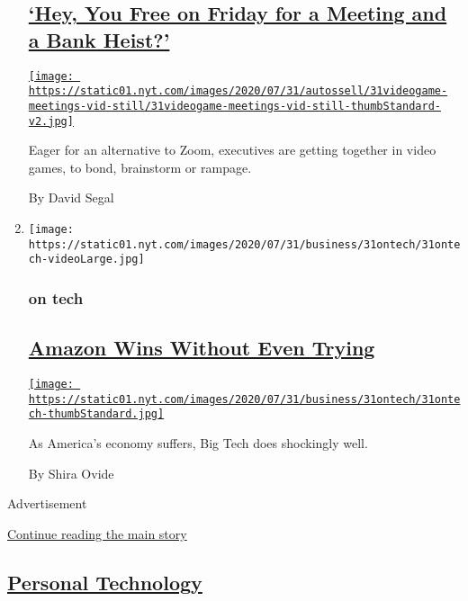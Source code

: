 \begin{enumerate}
{  \subsection{\texorpdfstring{\href{/2020/07/31/business/video-game-meetings.html}{`Hey,
  You Free on Friday for a Meeting and a Bank
  Heist?'}}{`Hey, You Free on Friday for a Meeting and a Bank Heist?'}}\label{hey-you-free-on-friday-for-a-meeting-and-a-bank-heist}}

  \href{/2020/07/31/business/video-game-meetings.html}{\texttt{[image: https://static01.nyt.com/images/2020/07/31/autossell/31videogame-meetings-vid-still/31videogame-meetings-vid-still-thumbStandard-v2.jpg]}}

  Eager for an alternative to Zoom, executives are getting together in
  video games, to bond, brainstorm or rampage.

  By David Segal
\item
  \texttt{[image: https://static01.nyt.com/images/2020/07/31/business/31ontech/31ontech-videoLarge.jpg]}

  \hypertarget{on-tech}{%
  \subsubsection{on tech}\label{on-tech}}

  \hypertarget{amazon-wins-without-even-trying}{%
  \subsection{\texorpdfstring{\href{/2020/07/31/technology/amazon-earnings.html}{Amazon
  Wins Without Even
  Trying}}{Amazon Wins Without Even Trying}}\label{amazon-wins-without-even-trying}}

  \href{/2020/07/31/technology/amazon-earnings.html}{\texttt{[image: https://static01.nyt.com/images/2020/07/31/business/31ontech/31ontech-thumbStandard.jpg]}}

  As America's economy suffers, Big Tech does shockingly well.

  By Shira Ovide
\end{enumerate}

Advertisement

\protect\hyperlink{after-mid1}{Continue reading the main story}

\hypertarget{personal-technology}{%
\subsection{\texorpdfstring{\href{/section/technology/personaltech}{Personal
Technology}}{Personal Technology}}\label{personal-technology}}

